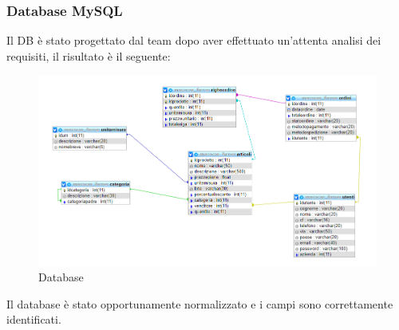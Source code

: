 \subsubsection{Database MySQL}
Il DB è stato progettato dal team dopo aver effettuato un'attenta analisi dei requisiti, il risultato è il seguente:
\begin{figure}[H]
	\includegraphics[width=\linewidth]{res/img/DB}
	\caption{Database}
	\label{Database Walk And Buy}
\end{figure}
Il database è stato opportunamente normalizzato e i campi sono correttamente identificati.

